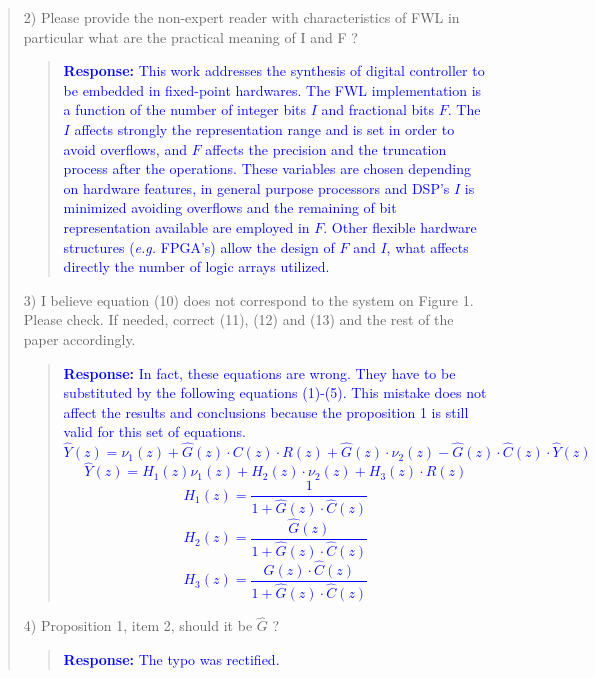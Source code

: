 \documentclass[11pt]{article}
\begin{document}
\begin{quote}
2) Please provide the non-expert reader with characteristics of FWL in particular what are the practical meaning of I and F ?

\begin{quote}
\textcolor{blue}{\textbf{Response:} This work addresses the synthesis of digital controller to be embedded in fixed-point hardwares. The FWL implementation is a function of the number of integer bits $I$ and fractional bits $F$. The $I$ affects strongly the representation range and is set in order to avoid overflows, and $F$ affects the precision and the truncation process after the operations. These variables are chosen depending on hardware features, in general purpose processors and DSP's $I$ is minimized avoiding overflows and the remaining of bit representation available are employed in $F$. Other flexible hardware structures (\textit{e.g.} FPGA's) allow the design of $F$ and $I$, what affects directly the number of logic arrays utilized.}
\end{quote}

3) I believe equation (10) does not correspond to the system on Figure 1. Please check. If needed, correct (11), (12) and (13) and the rest of the paper accordingly.
\begin{quote}
\textcolor{blue}{\textbf{Response:}
In fact, these equations are wrong. They have to be substituted by the following equations (1)-(5). This mistake does not affect the results and conclusions because the proposition 1 is still valid for this set of equations.
\begin{equation}
\hat{Y}(z)=\nu_{1}(z)+\hat{G}(z)\cdot C(z)\cdot R(z)+\hat{G}(z)\cdot\nu_{2}(z)-\hat{G}(z)\cdot \hat{C}(z)\cdot \hat{Y}(z)
\end{equation}
%
\begin{equation}
\hat{Y}(z)=H_{1}(z)\nu_{1}(z)+H_{2}(z)\cdot\nu_{2}(z)+H_{3}(z)\cdot R(z)
\end{equation}
%
\begin{equation}
H_{1}(z)=\frac{1}{1+\hat{G}(z)\cdot \hat{C}(z)}
\end{equation}
\begin{equation}
H_{2}(z)=\frac{\hat{G}(z)}{1+\hat{G}(z)\cdot \hat{C}(z)}
\end{equation}
\begin{equation}
H_{3}(z)=\frac{\hat{G}(z)\cdot \hat{C}(z)}{1+\hat{G}(z)\cdot \hat{C}(z)}
\end{equation}
}
\end{quote}


4) Proposition 1, item 2, should it be $\hat G$ ?
\begin{quote}
\textcolor{blue}{\textbf{Response:} The typo was rectified.}
\end{quote}


\end{quote}
\end{document}

